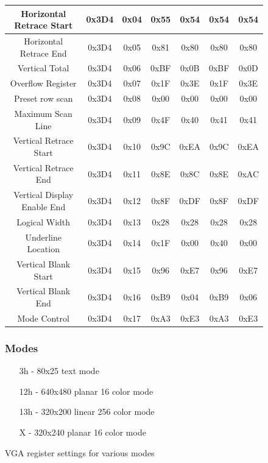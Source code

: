 \begin{appendices}
\begin{figure}[H]
\begin{tabular}{|c|c|c|c|c|c|c|}
\hline
Horizontal Retrace Start&0x3D4&0x04&0x55&0x54&0x54&0x54\\
\hline
Horizontal Retrace End&0x3D4&0x05&0x81&0x80&0x80&0x80\\
\hline
Vertical Total&0x3D4&0x06&0xBF&0x0B&0xBF&0x0D\\
\hline
Overflow Register&0x3D4&0x07&0x1F&0x3E&0x1F&0x3E\\
\hline
Preset row scan&0x3D4&0x08&0x00&0x00&0x00&0x00\\
\hline
Maximum Scan Line&0x3D4&0x09&0x4F&0x40&0x41&0x41\\
\hline
Vertical Retrace Start&0x3D4&0x10&0x9C&0xEA&0x9C&0xEA\\
\hline
Vertical Retrace End&0x3D4&0x11&0x8E&0x8C&0x8E&0xAC\\
\hline
Vertical Display Enable End&0x3D4&0x12&0x8F&0xDF&0x8F&0xDF\\
\hline
Logical Width&0x3D4&0x13&0x28&0x28&0x28&0x28\\
\hline
Underline Location&0x3D4&0x14&0x1F&0x00&0x40&0x00\\
\hline
Vertical Blank Start&0x3D4&0x15&0x96&0xE7&0x96&0xE7\\
\hline
Vertical Blank End&0x3D4&0x16&0xB9&0x04&0xB9&0x06\\
\hline
Mode Control&0x3D4&0x17&0xA3&0xE3&0xA3&0xE3\\
\hline
\end{tabular}
\subsubsection*{Modes}
\begin{itemize}
    \item[3h] - 80x25 text mode
    \item[12h] - 640x480 planar 16 color mode
    \item[13h] - 320x200 linear 256 color mode
    \item[X] - 320x240 planar 16 color mode
\end{itemize}
\caption{VGA register settings for various modes \cite{osdevvga}}
\end{figure}


\end{appendices}
